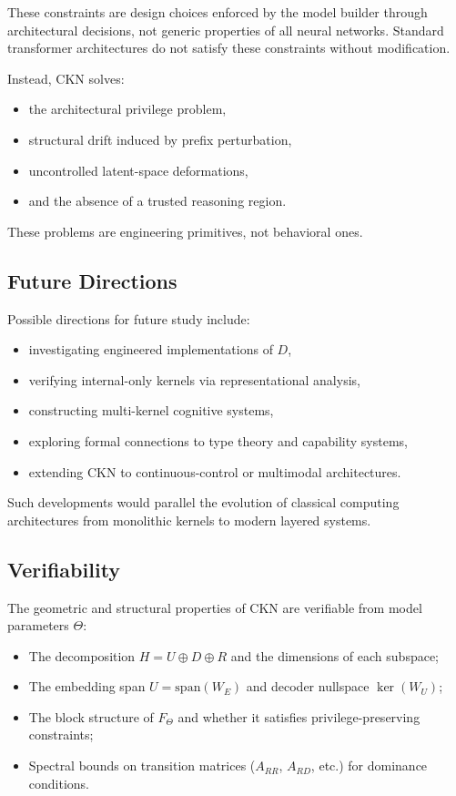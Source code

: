 \documentclass[11pt,a4paper]{article}
\begin{document}
These constraints are design choices enforced by the model builder through architectural decisions, not generic properties of all neural networks. Standard transformer architectures do not satisfy these constraints without modification.

Instead, CKN solves:
\begin{itemize}
    \item the architectural privilege problem,
    \item structural drift induced by prefix perturbation,
    \item uncontrolled latent-space deformations,
    \item and the absence of a trusted reasoning region.
\end{itemize}

These problems are engineering primitives, not behavioral ones.

\subsection{Future Directions}

Possible directions for future study include:
\begin{itemize}
    \item investigating engineered implementations of $D$,
    \item verifying internal-only kernels via representational analysis,
    \item constructing multi-kernel cognitive systems,
    \item exploring formal connections to type theory and capability systems,
    \item extending CKN to continuous-control or multimodal architectures.
\end{itemize}

Such developments would parallel the evolution of classical computing architectures from monolithic kernels to modern layered systems.

\subsection{Verifiability}

The geometric and structural properties of CKN are verifiable from model parameters $\Theta$:
\begin{itemize}
    \item The decomposition $H = U \oplus D \oplus R$ and the dimensions of each subspace;
    \item The embedding span $U = \text{span}(W_E)$ and decoder nullspace $\ker(W_U)$;
    \item The block structure of $F_\Theta$ and whether it satisfies privilege-preserving constraints;
    \item Spectral bounds on transition matrices ($A_{RR}$, $A_{RD}$, etc.) for dominance conditions.
\end{itemize}
\end{document}
